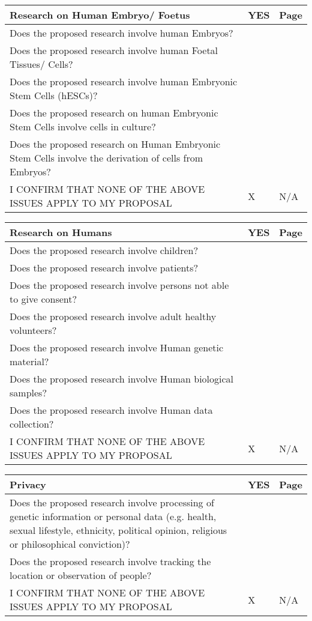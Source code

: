 \documentclass[a4paper,11pt]{article}
\begin{document}
\begin{tabular}{|p{10cm}|p{1cm}|p{1cm}|}\hline
\bf Research on Human Embryo/ Foetus									& YES	& Page	\\\hline
Does the proposed research involve human Embryos?							&	&	\\\hline
Does the proposed research involve human Foetal Tissues/ Cells?						&	&	\\\hline
Does the proposed research involve human Embryonic Stem Cells (hESCs)?					&	&	\\\hline
Does the proposed research on human Embryonic Stem Cells involve cells in culture?			&	&	\\\hline
Does the proposed research on Human Embryonic Stem Cells involve the derivation of cells from Embryos?	&	&	\\\hline
I CONFIRM THAT NONE OF THE ABOVE ISSUES APPLY TO MY PROPOSAL						&X	&N/A	\\\hline
\end{tabular}
\vspace{3mm}

\begin{tabular}{|p{10cm}|p{1cm}|p{1cm}|}\hline
\bf Research on Humans											& YES	& Page	\\\hline
Does the proposed research involve children?								&	&	\\\hline
Does the proposed research involve patients?								&	&	\\\hline
Does the proposed research involve persons not able to give consent?					&	&	\\\hline
Does the proposed research involve adult healthy volunteers?						&	&	\\\hline
Does the proposed research involve Human genetic material?						&	&	\\\hline
Does the proposed research involve Human biological samples?						&	&	\\\hline
Does the proposed research involve Human data collection?						&	&	\\\hline
I CONFIRM THAT NONE OF THE ABOVE ISSUES APPLY TO MY PROPOSAL						&X	&N/A	\\\hline
\end{tabular}
\vspace{3mm}

\begin{tabular}{|p{10cm}|p{1cm}|p{1cm}|}\hline
\bf Privacy												& YES	& Page	\\\hline
Does the proposed research involve processing of genetic information or personal 
data (e.g. health, sexual lifestyle, ethnicity, political opinion, religious or 
philosophical conviction)?										&	&	\\\hline			
Does the proposed research involve tracking the location or observation of people?			&	&	\\\hline
I CONFIRM THAT NONE OF THE ABOVE ISSUES APPLY TO MY PROPOSAL 						&X	&N/A	\\\hline
\end{tabular}
\vspace{3mm}
\end{document}
